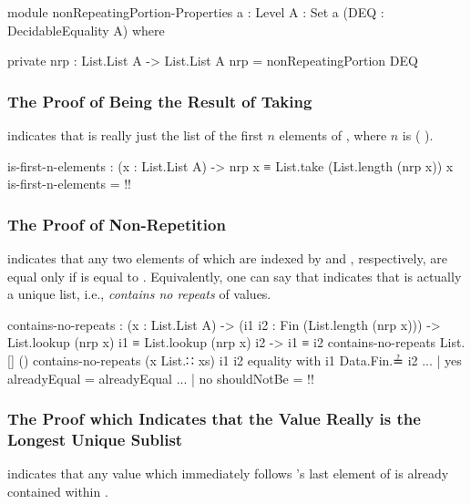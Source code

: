 \documentclass{report}
\begin{document}
\begin{code}
module nonRepeatingPortion-Properties
  {a : Level}
  {A : Set a}
  (DEQ : DecidableEquality A) where

  private
    nrp : List.List A -> List.List A
    nrp = nonRepeatingPortion DEQ
\end{code}

\subsubsection{The Proof of Being the Result of Taking}
  indicates that   is really just the list of the first \(n\) elements of , where \(n\) is  \AgdaSymbol( \AgdaSymbol).

\begin{code}
  is-first-n-elements :
    (x : List.List A) ->
    nrp x ≡ List.take (List.length (nrp x)) x
  is-first-n-elements = {!!}
\end{code}

\subsubsection{The Proof of Non-Repetition}
  indicates that any two elements of   which are indexed by  and , respectively, are equal only if  is equal to .  Equivalently, one can say that   indicates that   is actually a unique list, i.e., \emph{contains no repeats} of values.

\begin{code}
  contains-no-repeats :
    (x : List.List A) ->
    (i1 i2 : Fin (List.length (nrp x))) ->
    List.lookup (nrp x) i1 ≡ List.lookup (nrp x) i2 ->
    i1 ≡ i2
  contains-no-repeats List.[] ()
  contains-no-repeats (x List.∷ xs) i1 i2 equality with i1 Data.Fin.≟ i2
  ... | yes alreadyEqual = alreadyEqual
  ... | no shouldNotBe = {!!}
\end{code}

\subsubsection{The Proof which Indicates that the Value Really is the Longest Unique Sublist}
  indicates that any value which immediately follows  's last element of  is already contained within  .
\end{document}
